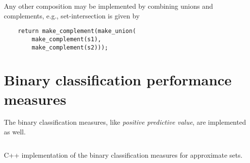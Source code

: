 \documentclass[ ../main.tex]{subfiles}
\begin{document}
Any other composition may be implemented by combining unions and complements, e.g., set-intersection is given by
\begin{verbatim}
    return make_complement(make_union(
        make_complement(s1),
        make_complement(s2)));
\end{verbatim}

\section{Binary classification performance measures}
The binary classification measures, like \emph{positive predictive value}, are implemented as well.

\begin{listing}
\inputminted[breaklines]{c++}{code/random_approximate_sets_adt/include/approximate_set/binary_classification.hpp}
\caption{C++ implementation of the binary classification measures for 
approximate sets.}
\label{lst:binclass}
\end{listing}
\end{document}
